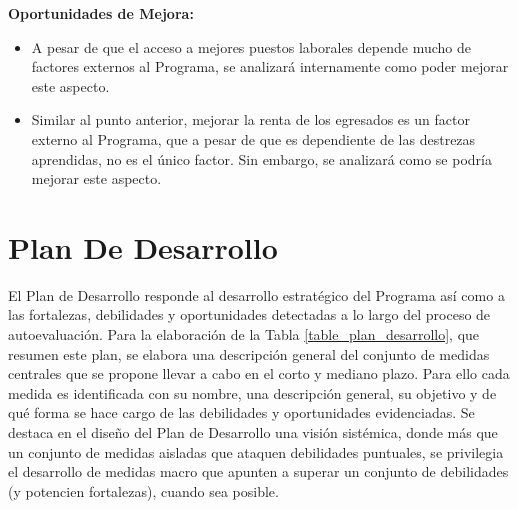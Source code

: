\noindent\textbf{Oportunidades de Mejora:}

\begin{itemize}
\item A pesar de que el acceso a mejores puestos laborales depende mucho de factores externos al Programa, se analizará internamente 
como poder mejorar este aspecto.
\item Similar al punto anterior, mejorar la renta de los egresados es un factor externo al Programa, que a pesar de que es dependiente de las 
destrezas aprendidas, no es el único factor. Sin embargo, se analizará como se podría mejorar este aspecto.
\end{itemize}



\section{Plan De Desarrollo}
\label{plan_de_desarrollo}

El Plan de Desarrollo responde al desarrollo estratégico del Programa así como a las fortalezas, debilidades y
oportunidades detectadas a lo largo del proceso de autoevaluación. Para la elaboración de la Tabla \ref{table_plan_desarrollo},
que resumen este plan, se elabora una descripción general del conjunto de medidas centrales que se propone llevar
a cabo en el corto y mediano plazo. Para ello cada medida es identificada con su nombre, una descripción general, su
objetivo y de qué forma se hace cargo de las debilidades y oportunidades evidenciadas. Se destaca en el diseño del Plan
de Desarrollo una visión sistémica, donde más que un conjunto de medidas aisladas que ataquen debilidades puntuales,
se privilegia el desarrollo de medidas macro que apunten a superar un conjunto de debilidades (y potencien fortalezas),
cuando sea posible.

